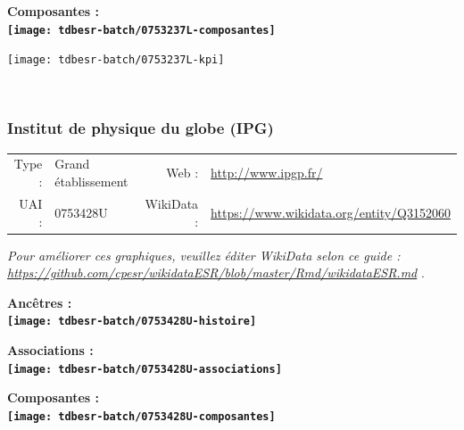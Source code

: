 \documentclass[12pt,french,]{article}
\begin{document}
\begin{center} \bf Composantes : \\  
\texttt{[image: tdbesr-batch/0753237L-composantes]} \end{center}

\begin{center}\texttt{[image: tdbesr-batch/0753237L-kpi]} \end{center}\checkoddpage

\ifoddpage \fi ~\newpage  

\hypertarget{institut-de-physique-du-globe-ipg}{%
\subsubsection{Institut de physique du globe
(IPG)}\label{institut-de-physique-du-globe-ipg}}

\begin{tabular*}{\textwidth}{rp{5cm}rl}  
\hline  
Type : & Grand établissement & Web : &\href{http://www.ipgp.fr/}{http://www.ipgp.fr/} \\  
UAI : & 0753428U & WikiData : & \href{https://www.wikidata.org/entity/Q3152060}{https://www.wikidata.org/entity/Q3152060} \\  
\hline  
\end{tabular*}

\textit{\scriptsize Pour améliorer ces graphiques, veuillez éditer WikiData selon ce guide :  \href{https://github.com/cpesr/wikidataESR/blob/master/Rmd/wikidataESR.md}{https://github.com/cpesr/wikidataESR/blob/master/Rmd/wikidataESR.md}}
.

\vspace{1cm}  
\begin{minipage}[b]{0.50\textwidth}\begin{center} \bf Ancêtres : \\  
\texttt{[image: tdbesr-batch/0753428U-histoire]} \end{center}\end{minipage}\begin{minipage}[b]{0.50\textwidth}\begin{center} \bf Associations : \\  
\texttt{[image: tdbesr-batch/0753428U-associations]} \end{center}\end{minipage}

\hrulefill

\begin{center} \bf Composantes : \\  
\texttt{[image: tdbesr-batch/0753428U-composantes]} \end{center}
\end{document}
